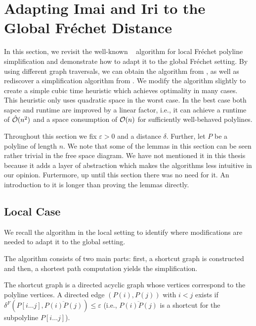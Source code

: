 \section{Adapting Imai and Iri to the Global Fréchet Distance}
\label{sec:global_imai_iri}

In this section, we revisit the well-known \citeauthor{computational_geometric_methods_for_polygonal_approximations_of_a_curve}~\cite{computational_geometric_methods_for_polygonal_approximations_of_a_curve} algorithm for local Fréchet polyline simplification and demonstrate how to adapt it to the global Fréchet setting. By using different graph traversals, we can obtain the algorithm from \citeauthor{on_optimal_polyline_simplification_using_the_hausdorff_and_frechet_distance}, as well as rediscover a simplification algorithm from \citeauthor{global_curve_simplification}. We modify the algorithm slightly to create a simple cubic time heuristic which achieves optimality in many cases. This heuristic only uses quadratic space in the worst case. In the best case both sapce and runtime are improved by a linear factor, i.e., it can achieve a runtime of \(\hat{\mathcal{O}}(n^2)\) and a space consumption of \(\mathcal{O}(n)\) for sufficiently well-behaved polylines.

Throughout this section we fix \(\varepsilon > 0\) and a distance \(\delta\). Further, let \(P\) be a polyline of length \(n\). We note that some of the lemmas in this section can be seen rather trivial in the free space diagram. We have not mentioned it in this thesis because it adds a layer of abstraction which makes the algorithms less intuitive in our opinion. Furtermore, up until this section there was no need for it. An introduction to it is longer than proving the lemmas directly.

\subsection{Local Case}

We recall the algorithm in the local setting to identify where modifications are needed to adapt it to the global setting. 

The algorithm consists of two main parts: first, a shortcut graph is constructed and then, a shortest path computation yields the simplification.

The shortcut graph is a directed acyclic graph whose vertices correspond to the polyline vertices. A directed edge \((P(i), P(j))\) with \(i < j\) exists if \(\delta^F(P[i \dots j], \overline{P(i)P(j)}) \leq \varepsilon\) (i.e., \(\overline{P(i)P(j)}\) is a shortcut for the subpolyline \(P[i \dots j]\)). 


